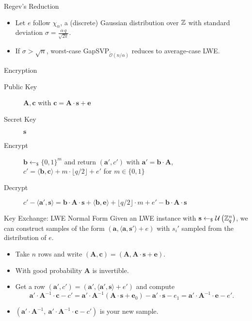 \documentclass[presentation,smaller]{beamer}
\newcommand{\ZZ}[1][blank]{\ensuremath{\ifthenelse{\equal{#1}{blank}}{\mathbb{Z}}{\mathbb{Z}\left[#1\right]}\xspace}}
\renewcommand{\U}[1]{\ensuremath{\mathcal{U}\left( {#1} \right)}\xspace}
\renewcommand{\vec}[1]{\ensuremath{\mathbf{#1}}\xspace}
\newcommand{\sample}{\ensuremath{\leftarrow_{\$}}}
\begin{document}
\begin{frame}[label={sec:orgf6824dd}]{Regev’s Reduction}
\begin{theorem}
\begin{itemize}
\item Let \(e\) follow \(χ_α\), a (discrete) Gaussian distribution over \(\ZZ\) with standard deviation \(σ = \frac{α\, q}{\sqrt{2π}}\).
\item If \(σ >  \sqrt{n}\), worst-case GapSVP\(_{\tilde{\mathcal{O}}(n/α)}\) reduces to average-case LWE.
\end{itemize}
\end{theorem}

\end{frame}


\begin{frame}[label={sec:orgd4bfd18}]{Encryption}
\begin{description}
\item[{Public Key}] \(\vec{A},\vec{c}\) with \(\vec{c} = \vec{A}\cdot \vec{s} + \vec{e}\)
\item[{Secret Key}] \(\vec{s}\)
\item[{Encrypt}] \(\vec{b} \sample \{0,1\}^m\) and return \((\vec{a}',c')\) with \(\vec{a}' = \vec{b} \cdot \vec{A}\), \(c' = \langle \vec{b}, \vec{c} \rangle + m \cdot \lfloor q/2\rfloor + e'\) for \(m \in \{0,1\}\)

\item[{Decrypt}] \(c' - \langle \vec{a}', \vec{s} \rangle = \vec{b} \cdot \vec{A} \cdot \vec{s} + \langle \vec{b}, \vec{e} \rangle + \lfloor q/2 \rfloor \cdot m + e' -  \vec{b} \cdot \vec{A} \cdot \vec{s}\)
\end{description}
\end{frame}

\begin{frame}[label={sec:org71d7424}]{Key Exchange: LWE Normal Form}
Given an LWE instance with \(\vec{s} \sample \U{\ZZ_q^n}\), we can construct samples of the form \((\vec{a}, \langle \vec{a}, \vec{s}'\rangle+e)\) with \(s_i'\) sampled from the distribution of \(e\).

\begin{itemize}
\item Take \(n\) rows and write \((\vec{A}, \vec{c}) = (\vec{A}, \vec{A}⋅\vec{s} + \vec{e})\).

\item With good probability \(\vec{A}\) is invertible.

\item Get a row \((\vec{a}', c') = (\vec{a}', \langle \vec{a}', \vec{s}\rangle + e')\) and compute  \[\vec{a}'⋅ \vec{A}^{-1} ⋅ \vec{c}-c' = \vec{a}' ⋅ \vec{A}^{-1} (\vec{A}⋅ \vec{s}+\vec{e}_0)- \vec{a}'·\vec{s}-e_1 = \vec{a}' ⋅ \vec{A}^{-1} ⋅ \vec{e} - e'.\]

\item \((\vec{a}' ⋅ \vec{A}^{-1},\  \vec{a}'⋅ \vec{A}^{-1} ⋅ \vec{c}-c')\) is your new sample.
\end{itemize}
\end{frame}
\end{document}
